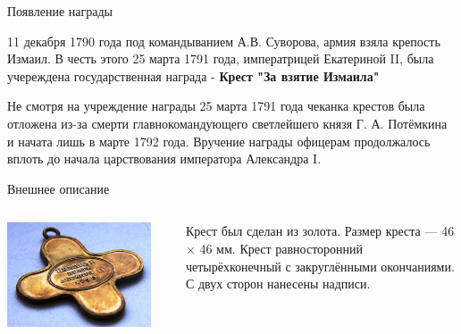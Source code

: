 \begin{frame}{Появление награды}

	11 декабря 1790 года под командыванием А.В. Суворова, армия взяла крепость Измаил. В честь этого 25 марта 1791 года, императрицей Екатериной II, была учереждена государственная награда - \textbf{Крест "За взятие Измаила"}

\end{frame}
\begin{frame}{}
	Не смотря на учреждение награды 25 марта 1791 года чеканка крестов была отложена из-за смерти главнокомандующего светлейшего князя Г. А. Потёмкина и начата лишь в марте 1792 года. Вручение награды офицерам продолжалось вплоть до начала царствования императора Александра I.
\end{frame}
\begin{frame}{Внешнее описание}
	\begin{columns}
		\begin{column}{0.45\textwidth}
			\includegraphics[width=0.9\textwidth]{medal.jpg}
		\end{column}
		\begin{column}{0.45\textwidth}

			Крест был сделан из золота. Размер креста — 46 × 46 мм. Крест равносторонний четырёхконечный с закруглёнными окончаниями. С двух сторон нанесены надписи.

		\end{column}
	\end{columns}
\end{frame}
